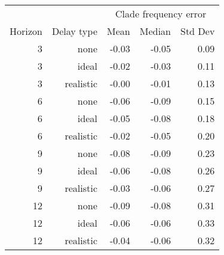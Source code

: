 
\begin{tabular*}{0.7\textwidth}{rrrrr}
\toprule
        &            & \multicolumn{3}{c}{Clade frequency error} \\
Horizon & Delay type & Mean & Median & Std Dev \\
\midrule

3 & none & -0.03 & -0.05 & 0.09 \\
3 & ideal & -0.02 & -0.03 & 0.11 \\
3 & realistic & -0.00 & -0.01 & 0.13 \\
6 & none & -0.06 & -0.09 & 0.15 \\
6 & ideal & -0.05 & -0.08 & 0.18 \\
6 & realistic & -0.02 & -0.05 & 0.20 \\
9 & none & -0.08 & -0.09 & 0.23 \\
9 & ideal & -0.06 & -0.08 & 0.26 \\
9 & realistic & -0.03 & -0.06 & 0.27 \\
12 & none & -0.09 & -0.08 & 0.31 \\
12 & ideal & -0.06 & -0.06 & 0.33 \\
12 & realistic & -0.04 & -0.06 & 0.32 \\

\bottomrule
\end{tabular*}

